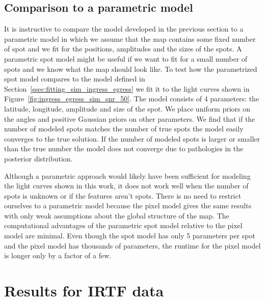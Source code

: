 \documentclass[modern]{aastex62}
\begin{document}
\subsection{Comparison to a parametric model}
It is instructive to compare the model developed in the previous section to a parametric model in which we assume that the map contains some fixed number of spot and we fit for the positions, amplitudes and the sizes of the spots.
A parametric spot model might be useful if we want to fit for a small number of spots and we know what the map should look like.
To test how the parametrized spot model compares to the model defined in Section~\ref{ssec:fitting_sim_ingress_egress} we fit it to the light curves shown in Figure~\ref{fig:ingress_egress_sim_snr_50}. 
The model consists of 4 parameters: the latitude, longitude, amplitude and size of the spot.
We place uniform priors on the angles and positive Gaussian priors on other parameters. 
We find that if the number of modeled spots matches the number of true spots the model easily converges to the true solution. 
If the number of modeled spots is larger or smaller than the true number the model does not converge due to pathologies in the posterior distribution.

Although a parametric approach would likely have been sufficient for modeling the light curves shown in this work, it does not work well when the number of spots is unknown or if the features aren't spots.
There is no need to restrict ourselves to a parametric model because the pixel model gives the same results with only weak assumptions about the global structure of the map. 
The computational advantages of the parametric spot model relative to the pixel model are minimal. 
Even though the spot model has only 5 parameters per spot and the pixel model has thousands of parameters, the runtime for the pixel model is longer only by a factor of a few. 

\section{Results for IRTF data}
\label{sec:results}
\end{document}
